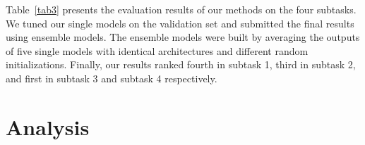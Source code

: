 \documentclass[letterpaper]{article} \usepackage{aaai20}  \usepackage{times}  \usepackage{helvet} \usepackage{courier}  \usepackage[hyphens]{url}  \usepackage{graphicx} \urlstyle{rm} \def\UrlFont{\rm}  \usepackage{graphicx}  \frenchspacing  \setlength{\pdfpagewidth}{8.5in}  \setlength{\pdfpageheight}{11in}
\begin{document}
    Table~\ref{tab3} presents the evaluation results of our methods on the four subtasks.
    We tuned our single models on the validation set and submitted the final results using ensemble models.
    The ensemble models were built by averaging the outputs of five single models with identical architectures and different random initializations.
    Finally, our results ranked fourth in subtask 1, third in subtask 2, and first in subtask 3 and subtask 4 respectively.


\section{Analysis}

    \begin{table}
\centering
      \caption{Ablation results for a single model on the validation set of Ubuntu dataset in subtask 1.}
      \label{tab4}
    \end{table}


    \begin{table}
\centering
      \caption{Ablation results for a single model on the validation set of Ubuntu dataset in subtask 2.}
      \label{tab5}
    \end{table}
\end{document}
